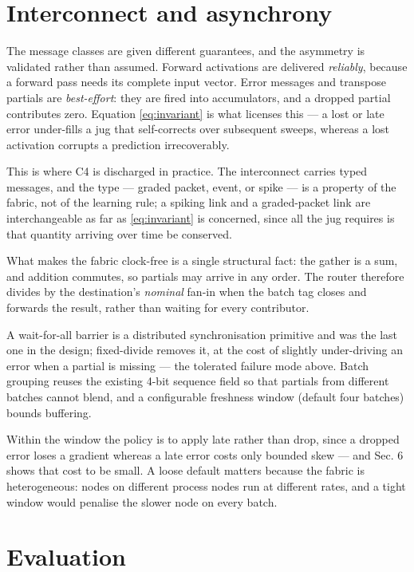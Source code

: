 \documentclass[11pt]{article}
\begin{document}
\hypertarget{sec:interconnect}{%
\section{Interconnect and asynchrony}\label{sec:interconnect}}

The message classes are given different guarantees, and the asymmetry is
validated rather than assumed. Forward activations are delivered
\emph{reliably}, because a forward pass needs its complete input vector.
Error messages and transpose partials are \emph{best-effort}: they are
fired into accumulators, and a dropped partial contributes zero.
Equation \eqref{eq:invariant} is what licenses this --- a lost or late error under-fills
a jug that self-corrects over subsequent sweeps, whereas a lost
activation corrupts a prediction irrecoverably.

This is where C4 is discharged in practice. The interconnect carries
typed messages, and the type --- graded packet, event, or spike --- is a
property of the fabric, not of the learning rule; a spiking link and a
graded-packet link are interchangeable as far as \eqref{eq:invariant} is concerned, since
all the jug requires is that quantity arriving over time be conserved.

What makes the fabric clock-free is a single structural fact: the gather
is a sum, and addition commutes, so partials may arrive in any order.
The router therefore divides by the destination's \emph{nominal} fan-in
when the batch tag closes and forwards the result, rather than waiting
for every contributor.

A wait-for-all barrier is a distributed synchronisation primitive and
was the last one in the design; fixed-divide removes it, at the cost of
slightly under-driving an error when a partial is missing --- the
tolerated failure mode above. Batch grouping reuses the existing 4-bit
sequence field so that partials from different batches cannot blend, and
a configurable freshness window (default four batches) bounds buffering.

Within the window the policy is to apply late rather than drop, since a
dropped error loses a gradient whereas a late error costs only bounded
skew --- and Sec. 6 shows that cost to be small. A loose default matters
because the fabric is heterogeneous: nodes on different process nodes
run at different rates, and a tight window would penalise the slower
node on every batch.

\hypertarget{sec:results}{%
\section{Evaluation}\label{sec:results}}
\end{document}
